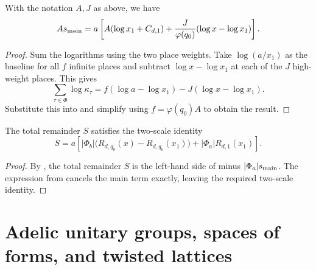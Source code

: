 \begin{lemma}
\label{lem:cancel-prime-sum-main-term}
\emitthmsource
With the notation $A,J$ as above, we have
\[
 A s_{\rm main}=a\left[A(\log x_1+C_{d,1})
                    +\frac{J}{\varphi(q_0)}(\log x-\log x_1)\right].
\]
\end{lemma}
\begin{proof}
Sum the logarithms using the two place weights. Take $\log(a/x_1)$ as the baseline for all $f$ infinite places and subtract $\log x-\log x_1$ at each of the $J$ high-weight places. This gives
\[
 \sum_{\tau\in\Phi}\log\kappa_\tau
 =f(\log a-\log x_1)-J(\log x-\log x_1).
\]
Substitute this into  and simplify using $f=\varphi(q_0)A$ to obtain the result.
\end{proof}

\begin{lemma}
\label{lem:remainder}
\emitthmsource
The total remainder $S$ satisfies the two-scale identity
\begin{equation}
 S=a\left[|\Phi_b|\bigl(R_{d,q_0}(x)-R_{d,q_0}(x_1)\bigr)
                  +|\Phi_a|R_{d,1}(x_1)\right].
\label{eq:ch1-remainder-eq}
\end{equation}
\end{lemma}
\begin{proof}
By , the total remainder $S$ is the left-hand side of  minus $|\Phi_a|s_{\rm main}$. The expression from  cancels the main term exactly, leaving the required two-scale identity.
\end{proof}

\section{Adelic unitary groups, spaces of forms, and twisted lattices}
\label{sec:automorphic-spaces}

